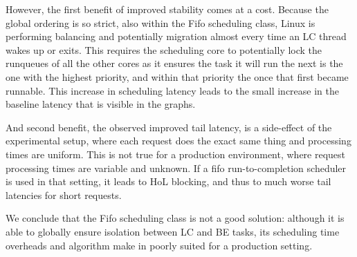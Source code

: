 However, the first benefit of improved stability comes at a cost. Because the
global ordering is so strict, also within the Fifo scheduling class, Linux is
performing balancing and potentially migration almost every time an LC thread
wakes up or exits. This requires the scheduling core to potentially lock the
runqueues of all the other cores as it ensures the task it will run the next is
the one with the highest priority, and within that priority the once that first
became runnable. This increase in scheduling latency leads to the small increase
in the baseline latency that is visible in the graphs.

And second benefit, the observed improved tail latency, is a side-effect of the
experimental setup, where each request does the exact same thing and processing
times are uniform. This is not true for a production environment, where request
processing times are variable and unknown. If a fifo run-to-completion scheduler
is used in that setting, it leads to HoL blocking, and thus to much worse tail
latencies for short requests.

We conclude that the Fifo scheduling class is not a good solution: although it
is able to globally ensure isolation between LC and BE tasks, its scheduling
time overheads and algorithm make in poorly suited for a production setting.



